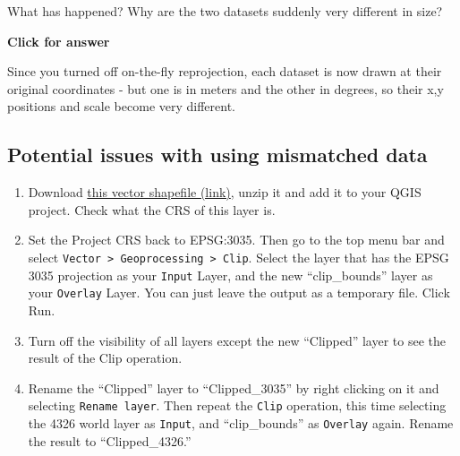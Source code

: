 \documentclass[
  letterpaper,
  DIV=11,
  numbers=noendperiod]{scrreprt}
\begin{document}
\begin{tcolorbox}[enhanced jigsaw, coltitle=black, toprule=.15mm, breakable, opacitybacktitle=0.6, left=2mm, colback=white, leftrule=.75mm, rightrule=.15mm, colbacktitle=quarto-callout-important-color!10!white, toptitle=1mm, titlerule=0mm, colframe=quarto-callout-important-color-frame, arc=.35mm, bottomtitle=1mm, opacityback=0, bottomrule=.15mm, title=\textcolor{quarto-callout-important-color}{\faExclamation}\hspace{0.5em}{Stop and Think}]

What has happened? Why are the two datasets suddenly very different in
size?

\end{tcolorbox}

\begin{tcolorbox}[enhanced jigsaw, toprule=.15mm, breakable, left=2mm, colframe=quarto-callout-important-color-frame, colback=white, arc=.35mm, leftrule=.75mm, opacityback=0, rightrule=.15mm, bottomrule=.15mm]

\vspace{-3mm}\textbf{Click for answer}\vspace{3mm}

Since you turned off on-the-fly reprojection, each dataset is now drawn
at their original coordinates - but one is in meters and the other in
degrees, so their x,y positions and scale become very different.

\end{tcolorbox}

\subsection{Potential issues with using mismatched
data}\label{potential-issues-with-using-mismatched-data}

\begin{enumerate}
\def\labelenumi{(\arabic{enumi})}
\setcounter{enumi}{58}
\item
  Download
  \href{https://stir-my.sharepoint.com/:u:/g/personal/ala2_stir_ac_uk/EWwn64TEDgFCvLE-JUwjUZEBMRXc6NKtQ0KWHk769hI4Jw?e=iR9RdT}{this
  vector shapefile (link)}, unzip it and add it to your QGIS project.
  Check what the CRS of this layer is.
\item
  Set the Project CRS back to EPSG:3035. Then go to the top menu bar and
  select
  \texttt{Vector\ \textgreater{}\ Geoprocessing\ \textgreater{}\ Clip}.
  Select the layer that has the EPSG 3035 projection as your
  \texttt{Input} Layer, and the new ``clip\_bounds'' layer as your
  \texttt{Overlay} Layer. You can just leave the output as a temporary
  file. Click Run.
\item
  Turn off the visibility of all layers except the new ``Clipped'' layer
  to see the result of the Clip operation.
\item
  Rename the ``Clipped'' layer to ``Clipped\_3035'' by right clicking on
  it and selecting \texttt{Rename\ layer}. Then repeat the \texttt{Clip}
  operation, this time selecting the 4326 world layer as \texttt{Input},
  and ``clip\_bounds'' as \texttt{Overlay} again. Rename the result to
  ``Clipped\_4326.''
\end{enumerate}
\end{document}
